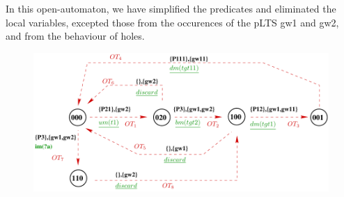 \documentclass{lncs/llncs}
\begin{document}
In this open-automaton, we have simplified the predicates and
eliminated the local variables, excepted those from the occurences of
the pLTS gw1 and gw2, and from the behaviour of holes.

\begin{figure}[h]
  \includegraphics[width=\linewidth]{XFIG/HB-OpenAut}
\end{figure}
\newpage
\end{document}
